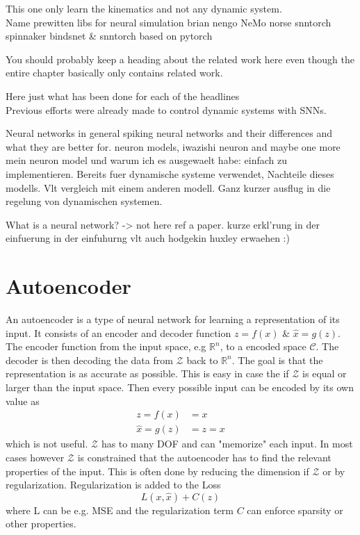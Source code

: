 This one only learn the kinematics and not any dynamic system.\\

Name prewitten libs for neural simulation
brian nengo NeMo norse snntorch spinnaker
bindsnet \& snntorch based on pytorch

You should probably keep a heading about the related work here even though the entire chapter basically only contains related work.

Here just what has been done for each of the headlines\\
Previous efforts were already made to control dynamic systems with \acp{SNN}.




Neural networks in general
spiking neural networks and their differences and what they are better for.
neuron models, iwazishi neuron and maybe one more
mein neuron model und warum ich es ausgewaelt habe: einfach zu implementieren. Bereits fuer dynamische systeme verwendet,
Nachteile dieses modells.
Vlt vergleich mit einem anderen modell.
Ganz kurzer ausflug in die regelung von dynamischen systemen.


What is a neural network? -> not here ref a paper. kurze erkl'rung in der einfuerung
in der einfuhurng vlt auch hodgekin huxley erwaehen :)




\section{Autoencoder}
An autoencoder is a type of neural network for learning a representation of its input. It consists of an encoder and decoder function $z =f(x)$ \& $\hat{x} = g(z)$. The encoder function from the input space, e.g $\mathbb{R}^n$, to a encoded space $\mathcal{C}$. The decoder is then decoding the data from $\mathcal{Z}$ back to $\mathbb{R}^n$. The goal is that the representation is as accurate as possible. This is easy in case the if $\mathcal{Z}$ is equal or larger than the input space. Then every possible input can be encoded by its own value as
\begin{equation}
\begin{aligned}
 	z = f(x) &= x\\
 	\hat{x} = g(z) &= z = x
\end{aligned}
\end{equation}
which is not useful. $\mathcal{Z}$ has to many DOF and can "memorize" each input. In most cases however $\mathcal{Z}$ is constrained that the autoencoder has to find the relevant properties of the input. This is often done by reducing the dimension if $\mathcal{Z}$ or by regularization. Regularization is added to the Loss
\begin{equation}
	L(x,\hat{x}) + C(z)
\end{equation}
where L can be e.g. MSE and the regularization term $C$ can enforce sparsity or other properties\cite{goodfellow_deep_2016}.


